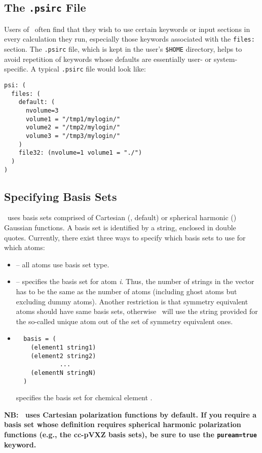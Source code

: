 \subsection{The {\tt .psirc} File} \label{psirc}

Users of \PSIthree\ often find that they wish to use certain keywords
or input sections in every calculation they run, especially those
keywords associated with the {\tt files:} section.  The {\tt .psirc}
file, which is kept in the user's {\tt \$HOME} directory, helps to
avoid repetition of keywords whose defaults are essentially user- or
system-specific.  A typical {\tt .psirc} file would look like:
\begin{verbatim}
psi: (
  files: (
    default: (
      nvolume=3
      volume1 = "/tmp1/mylogin/"
      volume2 = "/tmp2/mylogin/"
      volume3 = "/tmp3/mylogin/"
    )
    file32: (nvolume=1 volume1 = "./")
  )
)
\end{verbatim}

\subsection{Specifying Basis Sets}

\PSIthree\ uses basis sets comprised of Cartesian (, default) or spherical harmonic ()
Gaussian functions.  A basis set is identified by a string, enclosed
in double quotes. Currently, there exist three ways to specify which
basis sets to use for which atoms:
\begin{itemize}
\item {} -- all atoms use basis set type.
\item {} -- 
specifies the basis set for atom {\em i}. Thus, the number of strings
in the  vector has to be the same as the number of
atoms (including ghost atoms but excluding dummy atoms). Another
restriction is that symmetry equivalent atoms should have same basis
sets, otherwise \PSIinput\ will use the string provided for the
so-called unique atom out of the set of symmetry equivalent ones.
\item 
\begin{verbatim}
  basis = (
    (element1 string1)
    (element2 string2)
            ...
    (elementN stringN)
  )
\end{verbatim}
 specifies the basis set for chemical element 
.
\end{itemize}
{\bf NB: \PSIthree\ uses Cartesian polarization functions by default.
  If you require a basis set whose definition requires spherical harmonic
  polarization functions (e.g., the cc-pVXZ basis sets), be sure to
  use the {\tt puream=true} keyword.}

